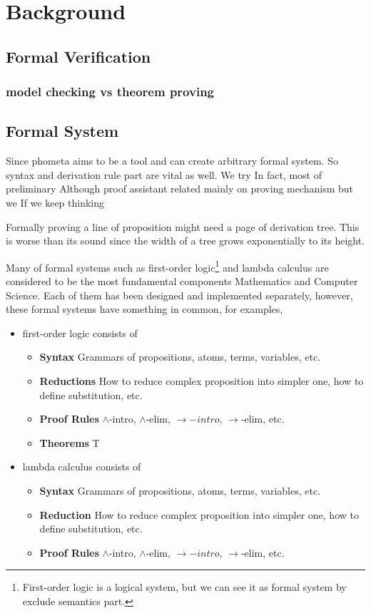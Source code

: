 

\chapter{Background}

\section{Formal Verification}
\subsection{model checking vs theorem proving}

\section{Formal System}
Since phometa aims to be a tool and can create arbitrary formal system. So syntax and derivation rule part are vital as well. We try In fact, most of preliminary
Although proof assistant related mainly on proving mechanism but we
If we keep thinking


 Formally proving a line of proposition might need a page of derivation tree. This is worse than its sound since the width of a tree grows exponentially to its height.


Many of formal systems such as first-order logic\footnote{First-order logic is a logical system, but we can see it as formal system by exclude semantics part.} and lambda calculus are considered to be the most fundamental components Mathematics and Computer Science. Each of them has been designed and implemented separately, however, these formal systems have something in common, for examples,

\begin{itemize}
  \item first-order logic consists of
  \begin{itemize}%
      \item \textbf{Syntax} Grammars of propositions, atoms, terms, variables, etc.
      \item \textbf{Reductions} How to reduce complex proposition into simpler one, how to define substitution, etc.
      \item \textbf{Proof Rules} $\wedge$-intro, $\wedge$-elim, $\rightarrow-intro$, $\rightarrow$-elim, etc.
      \item \textbf{Theorems} T
  \end{itemize}
  \item lambda calculus consists of
  \begin{itemize}%
      \item \textbf{Syntax} Grammars of propositions, atoms, terms, variables, etc.
      \item \textbf{Reduction} How to reduce complex proposition into simpler one, how to define substitution, etc.
      \item \textbf{Proof Rules} $\wedge$-intro, $\wedge$-elim, $\rightarrow-intro$, $\rightarrow$-elim, etc.
  \end{itemize}
\end{itemize}


